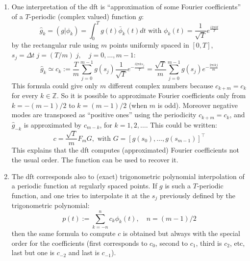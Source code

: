 \begin{mandescription}
\begin{enumerate}
\item One interpretation of the dft is ``approximation of some Fourier coefficients'' of
a $T$-periodic (complex valued) function $g$:
$$
      \hat{g}_k = ( g | \phi_k ) = \int_0^T g(t) \bar{\phi}_k(t) dt \mbox{ with } \phi_k(t) = \frac{1}{\sqrt{T}} e^{\frac{i 2\pi k t}{T}}
$$
by the rectangular rule using $m$ points uniformly spaced in $[0,T]$, $s_j = \Delta t \; j = (T/m) \; j, \quad j=0,\dots, m-1$:
$$
      \hat{g}_k \simeq c_k := \frac{T}{m} \sum_{j=0}^{m-1} g(s_j) \frac{1}{\sqrt{T}} e^{-\frac{i 2\pi  k s_j}{T}} 
             =  \frac{\sqrt{T}}{m} \sum_{j=0}^{m-1}  g(s_j)  e^{-\frac{2\pi i k j}{m}}
$$
This formula could give only $m$ different complex numbers because $c_{k+m} = c_k$ for every $k \in {\mathbb Z}$. So
it is possible to approximate Fourier coefficients only from $k = -(m-1)/2$ to  $k = (m-1)/2$ (when $m$ is
odd). Moreover negative modes are transposed as ``positive ones'' using the periodicity  $c_{k+m} = c_k$, and
$\hat{g}_{-k}$ is approximated by $c_{m-k}$, for $k=1,2, \dots$. This could be written:
$$
   c = \frac{\sqrt{T}}{m} F_m G, \mbox{  with } G = [ g(s_0), \dots, g(s_{m-1}) ]^{\top}
$$
This explains that the dft computes (approximated) Fourier coefficients not the usual order. The function 
 can be used to recover it.

\item The dft corresponds also to (exact) trigonometric polynomial interpolation of a periodic function at regularly spaced 
points. If $g$ is such a $T$-periodic function, and one tries to interpolate it at the $s_j$ previously defined
by the trigonometric polynomial:
$$
   p(t) := \sum_{k=-n}^n c_k \phi_k(t), \quad n = (m-1)/2
$$
then the same formula to compute $c$ is obtained but always with the special order for the coefficients
(first corresponds to $c_0$, second to $c_1$, third is $c_2$, etc, last but one is $c_{-2}$ and 
last is $c_{-1}$).    

\end{enumerate}

\end{mandescription}
 
